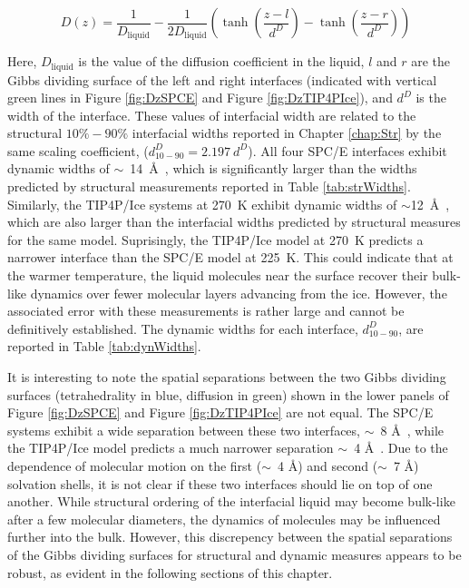\begin{equation}\label{eq:Dfit}
  D(z) = \frac{1}{D_\mathrm{liquid}} - \frac{1}{2D_\mathrm{liquid}} \left(
      \tanh \left( \frac{z-l}{d^D} \right) - \tanh \left( \frac{z-r}{d^D} \right) \right)
\end{equation}
  
Here, $D_\mathrm{liquid}$ is the value of the diffusion coefficient in
the liquid, $l$ and $r$ are the Gibbs dividing surface of the left and
right interfaces (indicated with vertical green lines in Figure
\ref{fig:DzSPCE} and Figure \ref{fig:DzTIP4PIce}), and $d^{D}$ is the
width of the interface. These values of interfacial width are related
to the structural $10\%-90\%$ interfacial widths reported in Chapter
\ref{chap:Str} by the same scaling coefficient,
($d_\mathrm{10-90}^{D} = 2.197~d^{D}$). All four SPC/E interfaces
exhibit dynamic widths of $\sim$~14~\AA~, which is significantly
larger than the widths predicted by structural measurements reported
in Table \ref{tab:strWidths}. Similarly, the TIP4P/Ice systems at
270~K exhibit dynamic widths of $\sim$12~\AA~, which are also larger
than the interfacial widths predicted by structural measures for the
same model. Suprisingly, the TIP4P/Ice model at 270~K predicts a
narrower interface than the SPC/E model at 225~K. This could indicate
that at the warmer temperature, the liquid molecules near the surface
recover their bulk-like dynamics over fewer molecular layers advancing
from the ice. However, the associated error with these measurements is
rather large and cannot be definitively established. The dynamic
widths for each interface, $d_\mathrm{10-90}^{D}$, are reported in
Table \ref{tab:dynWidths}.

It is interesting to note the spatial separations between the two
Gibbs dividing surfaces (tetrahedrality in blue, diffusion in green)
shown in the lower panels of Figure \ref{fig:DzSPCE} and Figure
\ref{fig:DzTIP4PIce} are not equal. The SPC/E systems exhibit a wide
separation between these two interfaces, $\sim$~8 \AA~, while the
TIP4P/Ice model predicts a much narrower separation $\sim$~4 \AA~. Due
to the dependence of molecular motion on the first ($\sim$~4 \AA) and
second ($\sim$~7 \AA) solvation shells, it is not clear if these two
interfaces should lie on top of one another. While structural ordering
of the interfacial liquid may become bulk-like after a few molecular
diameters, the dynamics of molecules may be influenced further into
the bulk. However, this discrepency between the spatial separations of
the Gibbs dividing surfaces for structural and dynamic measures
appears to be robust, as evident in the following sections of this
chapter.

